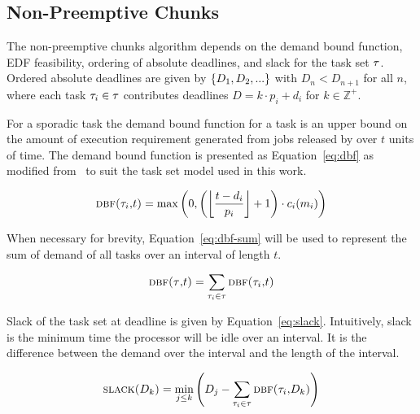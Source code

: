 \documentclass[a4paper,UKenglish,cleveref,autoref,english]{lipics-v2019}
\begin{document}
\subsection{Non-Preemptive Chunks}

The non-preemptive chunks algorithm depends on the demand bound
function, EDF feasibility, ordering of absolute deadlines, and slack
for the task set ${\tau}$. Ordered absolute deadlines are given by
${\{D_{1}, D_{2},   ... \}}$ with ${D_n < D_{n+1}}$
for all ${n}$, where each task ${\tau_{i} \in \tau}$ contributes
deadlines ${D = k \cdot p_i + d_i}$ for ${k \in \mathbb{Z}^+}$. 

For a sporadic task  the demand bound function for a task
 is an upper bound on the amount of execution
requirement generated from jobs released by  over ${t}$ units
of time. The demand bound function is presented as
Equation~\ref{eq:dbf} as  modified
from~\cite{Baruah:1990} to suit the task set model used in this work.

\begin{definition}
  \begin{equation}
    \label{eq:dbf}
    \text{\sc{dbf}(\ensuremath{\tau_{i}},${t}$)} = \max \left(0,
      \left( \left\lfloor \frac{t - d_i}{p_i} \right\rfloor + 1
      \right) \cdot c_i(m_i)
    \right)
  \end{equation}
\end{definition}

When necessary for brevity, Equation~\ref{eq:dbf-sum} will be used to
represent the sum of demand of all tasks over an interval of length
${t}$.

\begin{definition} 
  \begin{equation}
    \label{eq:dbf-sum}
    \text{\sc{dbf}(\ensuremath{\tau}{},$t$)} = \sum_{\tau_{i} \in \tau} \text{\sc{dbf}(\ensuremath{\tau_{i}},$t$)}
  \end{equation}
\end{definition}


Slack of the task set \tasks{} at deadline  is given by
Equation~\ref{eq:slack}. Intuitively, slack is the minimum time the
processor will be idle over an interval. It is the difference between
the demand over the interval and the length of the interval.

\begin{definition}
  \begin{equation}
    \label{eq:slack}
    \text{\sc{slack}(${D_k}$)} = \min_{j \le k}
      \left( D_j - \sum_{\tau_{i} \in \tau} \text{\sc{dbf}(\ensuremath{\tau_{i}},\ensuremath{D_{k}})}
      \right)
  \end{equation}
\end{definition}
\end{document}
